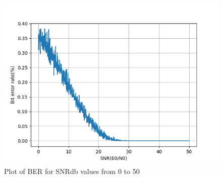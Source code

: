 \begin{figure}[htbp]
    \centering
    \includegraphics[width=\linewidth]{../Source/results/ber.png}
    \caption{Plot of BER for SNRdb values from 0 to 50}
    \label{ber}
\end{figure}